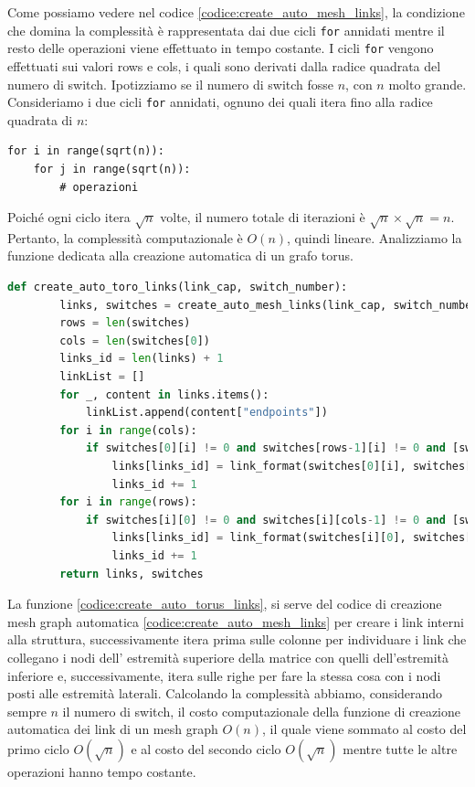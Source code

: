 \documentclass[binding=0.6cm]{sapthesis}
\begin{document}
Come possiamo vedere nel codice \ref{codice:create_auto_mesh_links}, la condizione che domina la complessità è rappresentata dai due cicli \texttt{for} annidati mentre il resto delle
operazioni viene effettuato in tempo costante. I cicli \texttt{for} vengono effettuati sui valori rows e cols, i quali sono derivati dalla radice quadrata del numero di switch. 
Ipotizziamo se il numero di switch fosse \(n\), con \(n\) molto grande. Consideriamo i due cicli \texttt{for} annidati, 
ognuno dei quali itera fino alla radice quadrata di \( n \):
\begin{verbatim}
for i in range(sqrt(n)):
    for j in range(sqrt(n)):
        # operazioni
\end{verbatim}
Poiché ogni ciclo itera \( \sqrt{n} \) volte, il numero totale di iterazioni è \( \sqrt{n} \times \sqrt{n} = n \). Pertanto, la complessità computazionale è \( O(n) \), quindi lineare.
Analizziamo la funzione dedicata alla creazione automatica di un grafo torus.

{\scriptsize %
\begin{lstlisting}[language=Python, basicstyle=\ttfamily, caption={Funzione per la creazione automatica di un grafo torus}, label={codice:create_auto_torus_links}, breaklines=true]
    def create_auto_toro_links(link_cap, switch_number):
        links, switches = create_auto_mesh_links(link_cap, switch_number)
        rows = len(switches)
        cols = len(switches[0])
        links_id = len(links) + 1
        linkList = []
        for _, content in links.items():
            linkList.append(content["endpoints"])
        for i in range(cols):
            if switches[0][i] != 0 and switches[rows-1][i] != 0 and [switches[0][i],switches[rows-1][i]] not in linkList:
                links[links_id] = link_format(switches[0][i], switches[rows-1][i], link_cap)
                links_id += 1
        for i in range(rows):
            if switches[i][0] != 0 and switches[i][cols-1] != 0 and [switches[i][0], switches[i][cols-1]] not in linkList:
                links[links_id] = link_format(switches[i][0], switches[i][cols-1], link_cap)
                links_id += 1
        return links, switches
\end{lstlisting}
} %

La funzione \ref{codice:create_auto_torus_links}, si serve del codice di creazione mesh graph automatica \ref{codice:create_auto_mesh_links} per 
creare i link interni alla struttura, successivamente itera prima sulle colonne per individuare i link che collegano i nodi dell' estremità superiore della matrice con quelli dell'estremità inferiore e,
successivamente, itera sulle righe per fare la stessa cosa con i nodi posti alle estremità laterali.
Calcolando la complessità abbiamo, considerando sempre \(n\) il numero di switch, il costo computazionale della funzione di creazione automatica dei link di un mesh graph \(O(n)\), il quale
viene sommato al costo del primo ciclo \(O(\sqrt{n})\) e al costo del secondo ciclo \(O(\sqrt{n})\) mentre tutte le altre operazioni hanno tempo costante.
\end{document}
